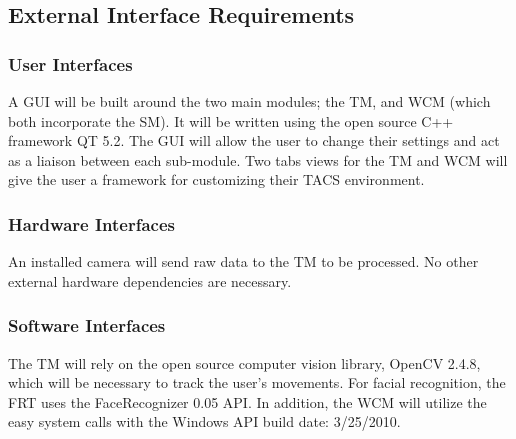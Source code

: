 \documentclass[titlepage]{article}
\begin{document}
%

\subsection{External Interface Requirements}

\subsubsection{User Interfaces}
A GUI will be built around the two main modules; the TM, and WCM (which both incorporate the SM). It will be written using the open source C++ framework QT 5.2. The GUI will allow the user to change their settings and act as a liaison between each sub-module. Two tabs views for the TM and WCM will give the user a framework for customizing their TACS environment.

\subsubsection{Hardware Interfaces}
An installed camera will send raw data to the TM to be processed. No other external hardware dependencies are necessary.

\subsubsection{Software Interfaces}
The TM will rely on the open source computer vision library, OpenCV 2.4.8, which will be necessary to track the user's movements. For facial recognition, the FRT uses the FaceRecognizer 0.05 API. In addition, the WCM will utilize the easy system calls with the Windows API build date: 3/25/2010.
\end{document}
